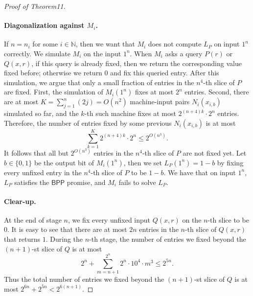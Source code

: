 \begin{proof}[Proof of Theorem11]
\paragraph{Diagonalization against $M_i$.}
If $n=n_i$ for some $i\in\mathbb N$, then we want that $M_i$ does not compute $L_P$ on input $1^n$ correctly. We simulate $M_i$ on the input $1^n$. When $M_i$ asks a query $P(r)$ or $Q(x,r)$, if this query is already fixed, then we return the corresponding value fixed before; otherwise we return $0$ and fix this queried entry.
After this simulation, we argue that only a small fraction of entries in the $n^4$-th slice of $P$ are fixed. First, the simulation of $M_i(1^n)$ fixes at most $2^n$ entries. Second, there are at most $K=\sum_{j=1}^n(2j)=O(n^2)$ machine-input pairs $N_i(x_{i,b})$ simulated so far, and the $k$-th such machine fixes at most $2^{(n+4)k}\cdot2^n$ entries. Therefore, the number of entries fixed by some previous $N_i(x_{i,b})$ is at most
\[\sum_{k=1}^K2^{(n+4)k}\cdot2^n\leq2^{O(n^3)}.\]
It follows that all but $2^{O(n^3)}$ entries in the $n^4$-th slice of $P$ are not fixed yet. Let $b\in\{0,1\}$ be the output bit of $M_i(1^n)$, then we set $L_P(1^n)=1-b$ by fixing every unfixed entry in the $n^4$-th slice of $P$ to be $1-b$. We have that on input $1^n$, $L_P$ satisfies the $\mathsf{BPP}$ promise, and $M_i$ fails to solve $L_P$.
\paragraph{Clear-up.}
At the end of stage $n$, we fix every unfixed input $Q(x,r)$ on the $n$-th slice to be $0$. It is easy to see that there are at most $2n$ entries in the $n$-th slice of $Q(x,r)$ that returns $1$.
During the $n$-th stage, the number of entries we fixed beyond the $(n+1)$-st slice of $Q$ is at most
\[2^n+\sum_{m=n+1}^{2^n}2^n\cdot10^4\cdot m^3\leq2^{5n}.\]
Thus the total number of entries we fixed beyond the $(n+1)$-st slice of $Q$ is at most $2^{6n}+2^{5n}<2^{6(n+1)}$.
\end{proof}
